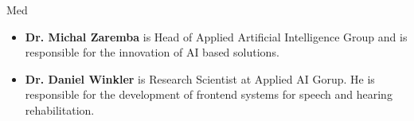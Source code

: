 \begin{sitedescription}{Med}
\begin{itemize} %

\item{\bf Dr. Michal Zaremba} is Head of Applied Artificial Intelligence Group and is responsible for the innovation of AI based solutions.

\item{\bf Dr. Daniel Winkler} is Research Scientist at Applied AI Gorup. He is responsible for the development of frontend systems for speech and hearing rehabilitation.
    
\end{itemize}

\end{sitedescription}

